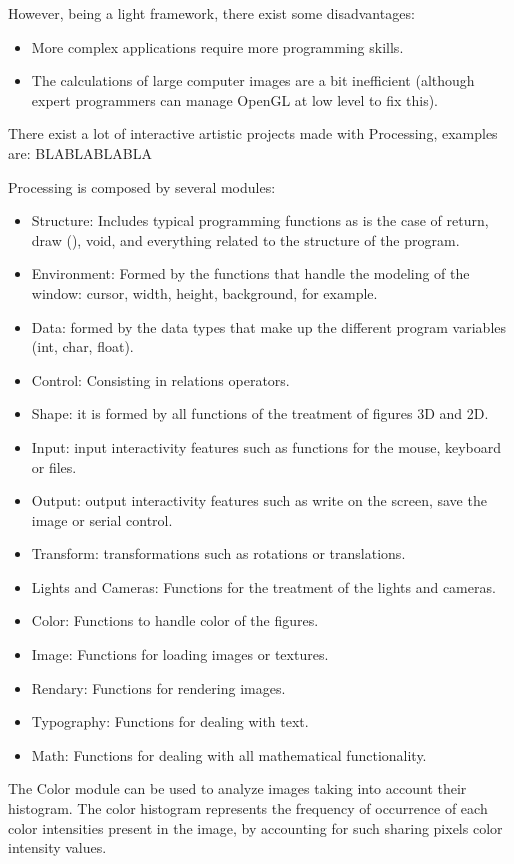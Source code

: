 \documentclass[conference]{IEEEtran}
\begin{document}
However, being a light framework, there exist some disadvantages:
\begin{itemize}
\item More complex applications require more programming skills.
\item The calculations of large computer images are a bit inefficient (although expert programmers can manage OpenGL at low level to fix this).
\end{itemize}

There exist a lot of interactive artistic projects made with Processing, examples are: BLABLABLABLA

Processing is composed by several modules:

\begin{itemize}
\item Structure: Includes typical programming functions as is the case of return, draw (), void, and everything related to the structure of the program.
\item Environment: Formed by the functions that handle the modeling of the window: cursor, width, height, background, for example.
\item Data: formed by the data types that make up the different program variables (int, char, float).
\item Control: Consisting in relations operators.
\item Shape: it is formed by all functions of the treatment of figures 3D and 2D.
\item Input: input interactivity features such as functions for the mouse, keyboard or files.
\item Output: output interactivity features such as write on the screen, save the image or serial control.
\item Transform: transformations such as rotations or translations.
\item Lights and Cameras: Functions for the treatment of the lights and cameras.
\item Color: Functions to handle color of the figures.
\item Image: Functions for loading images or textures.
\item Rendary: Functions for rendering images.
\item Typography: Functions for dealing with text.
\item Math: Functions for dealing with all mathematical functionality.
\end{itemize}

The Color module can be used to analyze images taking into account their histogram. The color histogram represents the frequency of occurrence of each color intensities present in the image, by accounting for such sharing pixels color intensity values.
\end{document}

